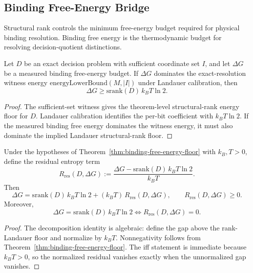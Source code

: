 \subsection{Binding Free-Energy Bridge}

Structural rank controls the minimum free-energy budget required for physical binding resolution. Binding free energy is the thermodynamic budget for resolving decision-quotient distinctions.

\begin{theorem}\label{thm:binding-free-energy-floor}
Let $D$ be an exact decision problem with sufficient coordinate set $I$, and let $\Delta G$ be a measured binding free-energy budget. If $\Delta G$ dominates the exact-resolution witness energy $\mathrm{energyLowerBound}(M,|I|)$ under Landauer calibration, then
\[
\Delta G \ge \mathrm{srank}(D)\,k_B T\ln 2.
\]
\end{theorem}

\begin{proof}
The sufficient-set witness gives the theorem-level structural-rank energy floor for $D$. Landauer calibration identifies the per-bit coefficient with $k_B T \ln 2$. If the measured binding free energy dominates the witness energy, it must also dominate the implied Landauer structural-rank floor.
\end{proof}

\begin{theorem}\label{thm:binding-free-energy-tightness}
Under the hypotheses of Theorem~\ref{thm:binding-free-energy-floor} with $k_B,T>0$, define the residual entropy term
\[
R_{\mathrm{res}}(D,\Delta G)
:=
\frac{\Delta G - \mathrm{srank}(D)\,k_B T\ln 2}{k_B T}.
\]
Then
\[
\Delta G
=
\mathrm{srank}(D)\,k_B T\ln 2 + (k_B T)\,R_{\mathrm{res}}(D,\Delta G),
\qquad
R_{\mathrm{res}}(D,\Delta G) \ge 0.
\]
Moreover,
\[
\Delta G = \mathrm{srank}(D)\,k_B T\ln 2
\iff
R_{\mathrm{res}}(D,\Delta G)=0.
\]
\end{theorem}

\begin{proof}
The decomposition identity is algebraic: define the gap above the rank-Landauer floor and normalize by $k_B T$. Nonnegativity follows from Theorem~\ref{thm:binding-free-energy-floor}. The iff statement is immediate because $k_B T>0$, so the normalized residual vanishes exactly when the unnormalized gap vanishes.
\end{proof}

